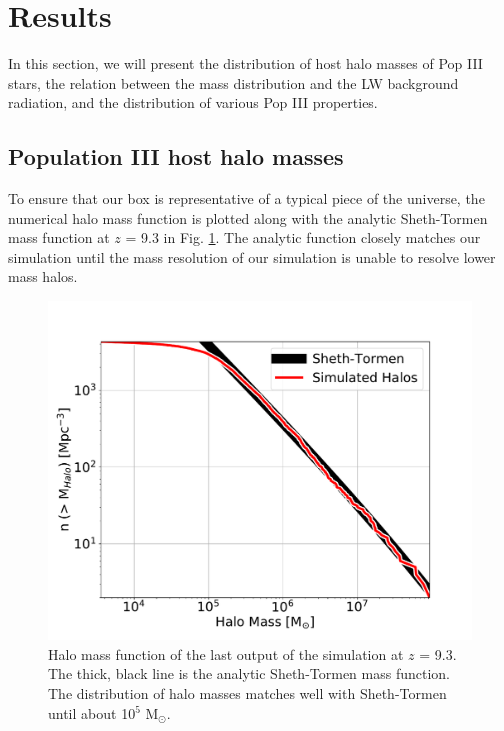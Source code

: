 \documentclass[a4paper,fleqn,usenatbib]{mnras}
\begin{document}
\section{Results}
In this section, we will present the distribution of host halo masses of Pop III stars, the relation between the mass distribution and the LW background radiation, and the distribution of various Pop III properties.

\subsection{Population III host halo masses}
To ensure that our box is representative of a typical piece of the universe, the numerical halo mass function is plotted along with the analytic Sheth-Tormen mass function at $z$ = 9.3 in Fig. \ref{fig:hmf}. The analytic function closely matches our simulation until the mass resolution of our simulation is unable to resolve lower mass halos. 

\begin{figure}
	\includegraphics[width=\columnwidth]{images/hmf.pdf}
    \caption{Halo mass function of the last output of the simulation at $z$ = 9.3. The thick, black line is the analytic Sheth-Tormen mass function. The distribution of halo masses matches well with Sheth-Tormen until about 10$^{5}$ M$_{\odot}$.}
    \label{fig:hmf}
\end{figure}
\end{document}
